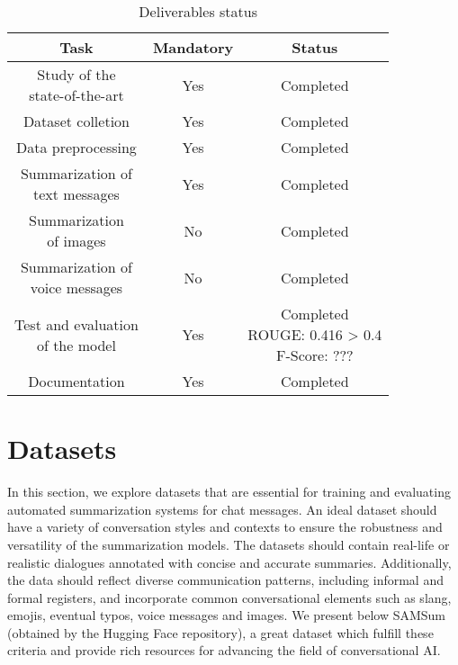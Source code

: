\documentclass[10pt,twocolumn,letterpaper]{article}
\begin{document}
\begin{table}[h!]
    \centering
    \begin{tabular}{|c|c|c|}
        \hline
        \rowcolor{lightergray}
        Task & Mandatory & Status\\ 
        \hline
        \makecell{Study of the \\ state-of-the-art } & Yes & Completed \\
        \hline
        Dataset colletion & Yes & Completed \\
        \hline
        Data preprocessing & Yes & Completed \\
        \hline
        \makecell{Summarization of \\ text messages} & Yes & Completed \\
        \hline
        \makecell{Summarization \\ of images} & No & Completed \\
        \hline
        \makecell{Summarization of \\ voice messages} & No & Completed \\
        \hline
        \makecell{Test and evaluation \\ of the model} & Yes & \makecell{Completed \\ ROUGE: 0.416 > 0.4 \\ F-Score: ???} \\
        \hline
        Documentation & Yes & Completed \\
        \hline
    \end{tabular}
    \caption{Deliverables status}
    \label{table:Deliverables}
\end{table}

\section{Datasets}

In this section, we explore datasets that are essential for training and evaluating automated summarization systems for chat messages. An ideal dataset should have a variety of conversation styles and contexts to ensure the robustness and versatility of the summarization models. The datasets should contain real-life or realistic dialogues annotated with concise and accurate summaries. Additionally, the data should reflect diverse communication patterns, including informal and formal registers, and incorporate common conversational elements such as slang, emojis, eventual typos, voice messages and images. We present below SAMSum (obtained by the Hugging Face repository), a great dataset which fulfill these criteria and provide rich resources for advancing the field of conversational AI.
\end{document}
